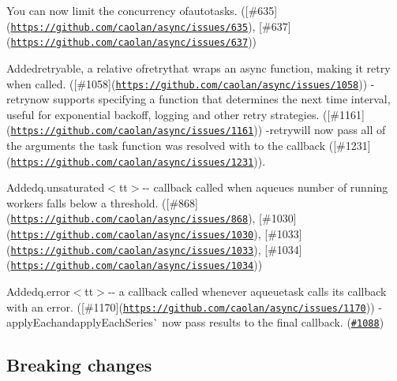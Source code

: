 \begin{DoxyItemize}
\item {\ttfamily You can now limit the concurrency of}auto{\ttfamily tasks. (\mbox{[}\#635\mbox{]}(\href{https://github.com/caolan/async/issues/635}{\tt https\+://github.\+com/caolan/async/issues/635}), \mbox{[}\#637\mbox{]}(\href{https://github.com/caolan/async/issues/637}{\tt https\+://github.\+com/caolan/async/issues/637}))}
\item {\ttfamily Added}retryable{\ttfamily , a relative of}retry{\ttfamily that wraps an async function, making it retry when called. (\mbox{[}\#1058\mbox{]}(\href{https://github.com/caolan/async/issues/1058}{\tt https\+://github.\+com/caolan/async/issues/1058})) -\/}retry{\ttfamily now supports specifying a function that determines the next time interval, useful for exponential backoff, logging and other retry strategies. (\mbox{[}\#1161\mbox{]}(\href{https://github.com/caolan/async/issues/1161}{\tt https\+://github.\+com/caolan/async/issues/1161})) -\/}retry{\ttfamily will now pass all of the arguments the task function was resolved with to the callback (\mbox{[}\#1231\mbox{]}(\href{https://github.com/caolan/async/issues/1231}{\tt https\+://github.\+com/caolan/async/issues/1231})).}
\item {\ttfamily Added}q.\+unsaturated$<$tt$>$-\/-\/ callback called when aqueue{\ttfamily \textquotesingle{}s number of running workers falls below a threshold. (\mbox{[}\#868\mbox{]}(\href{https://github.com/caolan/async/issues/868}{\tt https\+://github.\+com/caolan/async/issues/868}), \mbox{[}\#1030\mbox{]}(\href{https://github.com/caolan/async/issues/1030}{\tt https\+://github.\+com/caolan/async/issues/1030}), \mbox{[}\#1033\mbox{]}(\href{https://github.com/caolan/async/issues/1033}{\tt https\+://github.\+com/caolan/async/issues/1033}), \mbox{[}\#1034\mbox{]}(\href{https://github.com/caolan/async/issues/1034}{\tt https\+://github.\+com/caolan/async/issues/1034}))}
\item {\ttfamily Added}q.\+error$<$tt$>$-\/-\/ a callback called whenever aqueue{\ttfamily task calls its callback with an error. (\mbox{[}\#1170\mbox{]}(\href{https://github.com/caolan/async/issues/1170}{\tt https\+://github.\+com/caolan/async/issues/1170})) -\/}apply\+Each{\ttfamily and}apply\+Each\+Series\`{} now pass results to the final callback. (\href{https://github.com/caolan/async/issues/1088}{\tt \#1088})
\end{DoxyItemize}

\subsection*{Breaking changes}


